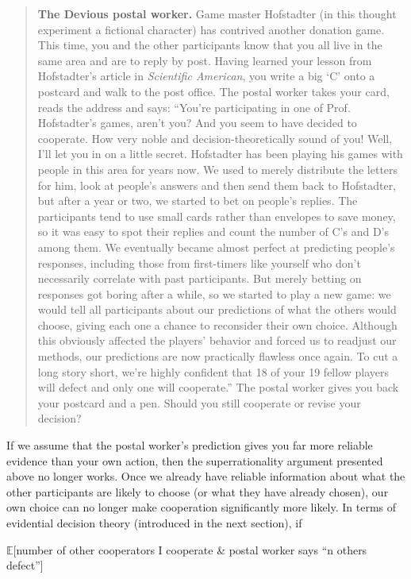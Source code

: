 \begin{quote}
\textbf{The Devious postal worker.} Game master Hofstadter (in this
thought experiment a fictional character) has contrived another donation
game. This time, you and the other participants know that you all live
in the same area and are to reply by post. Having learned your lesson
from Hofstadter's article in \emph{Scientific American}, you write a big
`C' onto a postcard and walk to the post office. The postal worker takes
your card, reads the address and says: ``You're participating in one of
Prof. Hofstadter's games, aren't you? And you seem to have decided to
cooperate. How very noble and decision-theoretically sound of you! Well,
I'll let you in on a little secret. Hofstadter has been playing his
games with people in this area for years now. We used to merely
distribute the letters for him, look at people's answers and then send
them back to Hofstadter, but after a year or two, we started to bet on
people's replies. The participants tend to use small cards rather than
envelopes to save money, so it was easy to spot their replies and count
the number of C's and D's among them. We eventually became almost
perfect at predicting people's responses, including those from
first-timers like yourself who don't necessarily correlate with past
participants. But merely betting on responses got boring after a while,
so we started to play a new game: we would tell all participants about
our predictions of what the others would choose, giving each one a
chance to reconsider their own choice. Although this obviously affected
the players' behavior and forced us to readjust our methods, our
predictions are now practically flawless once again. To cut a long story
short, we're highly confident that 18 of your 19 fellow players will
defect and only one will cooperate.'' The postal worker gives you back
your postcard and a pen. Should you still cooperate or revise your
decision?
\end{quote}

If we assume that the postal worker's prediction gives you far more
reliable evidence than your own action, then the superrationality
argument presented above no longer works. Once we already have reliable
information about what the other participants are likely to choose (or
what they have already chosen), our own choice can no longer make
cooperation significantly more likely. In terms of evidential decision
theory (introduced in the next section), if

$\mathbb{E}${[}number of other cooperators \textbar{} I cooperate \& postal worker
says ``n others defect''{]}

